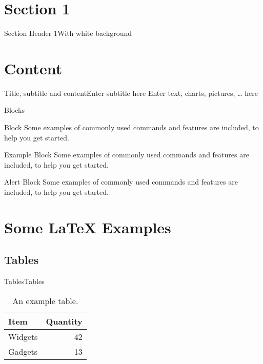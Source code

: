 \documentclass[10pt]{beamer} %
\begin{document}
\section{Section 1}
{\sectionheaderWhite %
\begin{frame}{Section Header 1}{With white background}
\end{frame}
}

\section{Content} 
\begin{frame}{Title, subtitle and content}{Enter subtitle here}
Enter text, charts, pictures, … here
\end{frame}

\begin{frame}{Blocks}

\begin{block}{Block}
Some examples of commonly used commands and features are included, to help you get started.
\end{block}

\begin{exampleblock}{Example Block}
Some examples of commonly used commands and features are included, to help you get started.
\end{exampleblock}

\begin{alertblock}{Alert Block}
Some examples of commonly used commands and features are included, to help you get started.
\end{alertblock}

\end{frame}

\section{Some \LaTeX{} Examples}
\subsection{Tables}

\begin{frame}{Tables}{Tables}

\begin{table}
\centering
\begin{tabular}{l|r}
Item & Quantity \\\hline
Widgets & 42 \\
Gadgets & 13
\end{tabular}
\caption{\label{tab:widgets}An example table.}
\end{table}

\end{frame}
\end{document}
